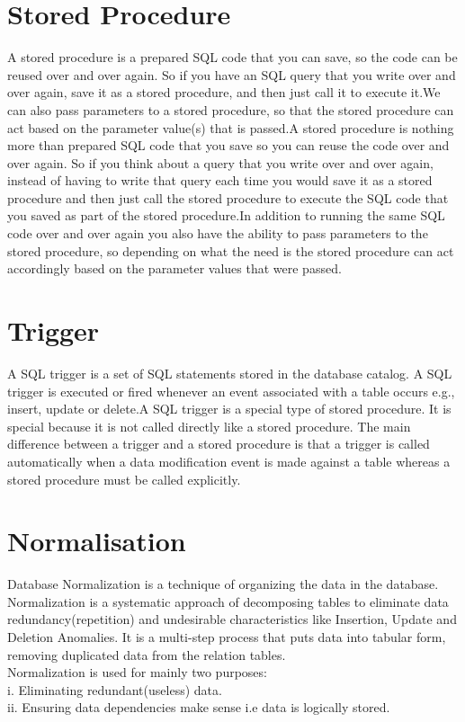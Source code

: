 \documentclass[12pt,a4paper]{report}
\begin{document}
\section{Stored Procedure}
A stored procedure is a prepared SQL code that you can save, so the code can be reused over and over again.
So if you have an SQL query that you write over and over again, save it as a stored procedure, and then just call it to execute it.We can also pass parameters to a stored procedure, so that the stored procedure can act based on the parameter value(s) that is passed.A stored procedure is nothing more than prepared SQL code that you save so you can reuse the code over and over again.  So if you think about a query that you write over and over again, instead of having to write that query each time you would save it as a stored procedure and then just call the stored procedure to execute the SQL code that you saved as part of the stored procedure.In addition to running the same SQL code over and over again you also have the ability to pass parameters to the stored procedure, so depending on what the need is the stored procedure can act accordingly based on the parameter values that were passed.

\section{Trigger}

A SQL trigger is a set of  SQL statements stored in the database catalog. A SQL trigger is executed or fired whenever an event associated with a table occurs e.g.,  insert, update or delete.A SQL trigger is a special type of stored procedure. It is special because it is not called directly like a stored procedure. The main difference between a trigger and a stored procedure is that a trigger is called automatically when a data modification event is made against a table whereas a stored procedure must be called explicitly.

\section{Normalisation}
Database Normalization is a technique of organizing the data in the database. Normalization is a systematic approach of decomposing tables to eliminate data redundancy(repetition) and undesirable characteristics like Insertion, Update and Deletion Anomalies. It is a multi-step process that puts data into tabular form, removing duplicated data from the relation tables.\\
Normalization is used for mainly two purposes:\\
i. Eliminating redundant(useless) data.\\
ii. Ensuring data dependencies make sense i.e data is logically stored.
\end{document}
